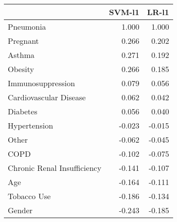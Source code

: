\begin{tabular}{lrr}
\toprule
{} &  SVM-l1 &  LR-l1 \\
\midrule
Pneumonia                   &   1.000 &  1.000 \\
Pregnant                    &   0.266 &  0.202 \\
Asthma                      &   0.271 &  0.192 \\
Obesity                     &   0.266 &  0.185 \\
Immunosuppression           &   0.079 &  0.056 \\
Cardiovascular Disease      &   0.062 &  0.042 \\
Diabetes                    &   0.056 &  0.040 \\
Hypertension                &  -0.023 & -0.015 \\
Other                       &  -0.062 & -0.045 \\
COPD                        &  -0.102 & -0.075 \\
Chronic Renal Insufficiency &  -0.141 & -0.107 \\
Age                         &  -0.164 & -0.111 \\
Tobacco Use                 &  -0.186 & -0.134 \\
Gender                      &  -0.243 & -0.185 \\
\bottomrule
\end{tabular}
